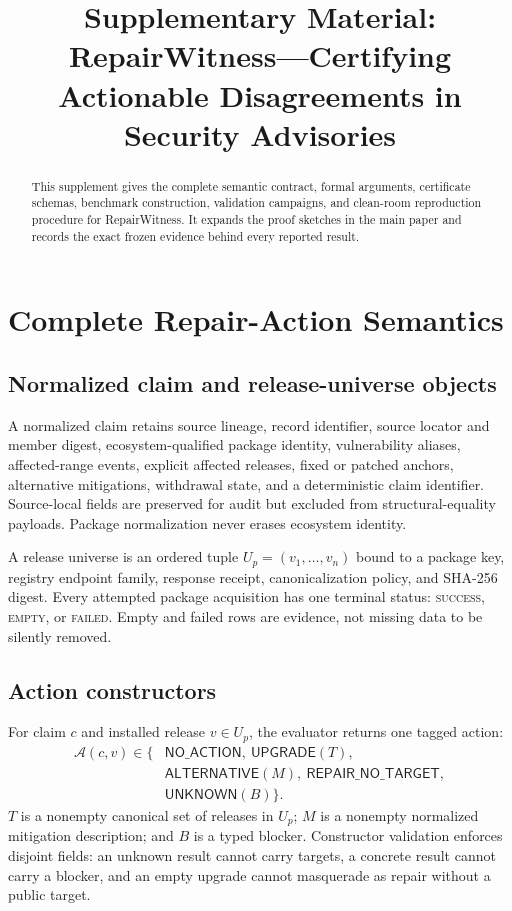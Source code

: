 \documentclass[10pt,conference]{IEEEtran}
\title{Supplementary Material: RepairWitness---Certifying Actionable Disagreements in Security Advisories}
\author{\IEEEauthorblockN{Anonymous Author(s)}}
\newcommand{\Act}{\mathcal{A}}
\newcommand{\unknown}{\ensuremath{\mathsf{UNKNOWN}}}
\newcommand{\noaction}{\ensuremath{\mathsf{NO\_ACTION}}}
\newcommand{\upgrade}{\ensuremath{\mathsf{UPGRADE}}}
\newcommand{\alternative}{\ensuremath{\mathsf{ALTERNATIVE}}}
\newcommand{\notarget}{\ensuremath{\mathsf{REPAIR\_NO\_TARGET}}}
\begin{document}
\maketitle

\begin{abstract}
This supplement gives the complete semantic contract, formal arguments, certificate schemas, benchmark construction, validation campaigns, and clean-room reproduction procedure for RepairWitness. It expands the proof sketches in the main paper and records the exact frozen evidence behind every reported result.
\end{abstract}

\section{Complete Repair-Action Semantics}
\subsection{Normalized claim and release-universe objects}
A normalized claim retains source lineage, record identifier, source locator and member digest, ecosystem-qualified package identity, vulnerability aliases, affected-range events, explicit affected releases, fixed or patched anchors, alternative mitigations, withdrawal state, and a deterministic claim identifier. Source-local fields are preserved for audit but excluded from structural-equality payloads. Package normalization never erases ecosystem identity.

A release universe is an ordered tuple $U_p=(v_1,\ldots,v_n)$ bound to a package key, registry endpoint family, response receipt, canonicalization policy, and SHA-256 digest. Every attempted package acquisition has one terminal status: \textsc{success}, \textsc{empty}, or \textsc{failed}. Empty and failed rows are evidence, not missing data to be silently removed.

\subsection{Action constructors}
For claim $c$ and installed release $v\in U_p$, the evaluator returns one tagged action:
\[
\begin{aligned}
\Act(c,v)\in\{&
\noaction,\ \upgrade(T),\\
&\alternative(M),\ \notarget,\\
&\unknown(B)\}.
\end{aligned}
\]
$T$ is a nonempty canonical set of releases in $U_p$; $M$ is a nonempty normalized mitigation description; and $B$ is a typed blocker. Constructor validation enforces disjoint fields: an unknown result cannot carry targets, a concrete result cannot carry a blocker, and an empty upgrade cannot masquerade as repair without a public target.
\end{document}
